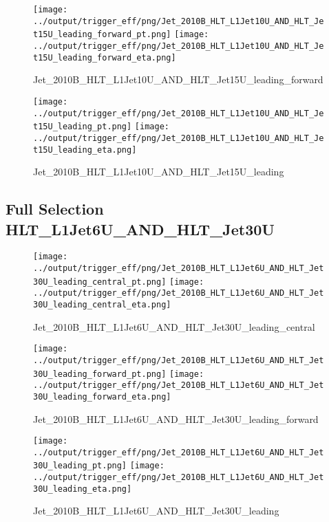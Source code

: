 \documentclass[11pt]{article}
\begin{document}
\begin{figure}[ht]
\centering
\texttt{[image: ../output/trigger\_eff/png/Jet\_2010B\_HLT\_L1Jet10U\_AND\_HLT\_Jet15U\_leading\_forward\_pt.png]}
\texttt{[image: ../output/trigger\_eff/png/Jet\_2010B\_HLT\_L1Jet10U\_AND\_HLT\_Jet15U\_leading\_forward\_eta.png]}
\caption{Jet\_2010B\_HLT\_L1Jet10U\_AND\_HLT\_Jet15U\_leading\_forward}
\label{fig:jet_L1Jet10U_AND_HLT_Jet15U_leading_forward}
\end{figure}

\begin{figure}[ht]
\centering
\texttt{[image: ../output/trigger\_eff/png/Jet\_2010B\_HLT\_L1Jet10U\_AND\_HLT\_Jet15U\_leading\_pt.png]}
\texttt{[image: ../output/trigger\_eff/png/Jet\_2010B\_HLT\_L1Jet10U\_AND\_HLT\_Jet15U\_leading\_eta.png]}
\caption{Jet\_2010B\_HLT\_L1Jet10U\_AND\_HLT\_Jet15U\_leading}
\label{fig:jet_L1Jet10U_AND_HLT_Jet15U_leading}
\end{figure}

\newpage
\subsection{Full Selection HLT\_L1Jet6U\_AND\_HLT\_Jet30U}
\begin{figure}[ht]
\centering
\texttt{[image: ../output/trigger\_eff/png/Jet\_2010B\_HLT\_L1Jet6U\_AND\_HLT\_Jet30U\_leading\_central\_pt.png]}
\texttt{[image: ../output/trigger\_eff/png/Jet\_2010B\_HLT\_L1Jet6U\_AND\_HLT\_Jet30U\_leading\_central\_eta.png]}
\caption{Jet\_2010B\_HLT\_L1Jet6U\_AND\_HLT\_Jet30U\_leading\_central}
\label{fig:jet_L1Jet6U_AND_HLT_Jet30U_leading_central}
\end{figure}

\begin{figure}[ht]
\centering
\texttt{[image: ../output/trigger\_eff/png/Jet\_2010B\_HLT\_L1Jet6U\_AND\_HLT\_Jet30U\_leading\_forward\_pt.png]}
\texttt{[image: ../output/trigger\_eff/png/Jet\_2010B\_HLT\_L1Jet6U\_AND\_HLT\_Jet30U\_leading\_forward\_eta.png]}
\caption{Jet\_2010B\_HLT\_L1Jet6U\_AND\_HLT\_Jet30U\_leading\_forward}
\label{fig:jet_L1Jet6U_AND_HLT_Jet30U_leading_forward}
\end{figure}

\begin{figure}[ht]
\centering
\texttt{[image: ../output/trigger\_eff/png/Jet\_2010B\_HLT\_L1Jet6U\_AND\_HLT\_Jet30U\_leading\_pt.png]}
\texttt{[image: ../output/trigger\_eff/png/Jet\_2010B\_HLT\_L1Jet6U\_AND\_HLT\_Jet30U\_leading\_eta.png]}
\caption{Jet\_2010B\_HLT\_L1Jet6U\_AND\_HLT\_Jet30U\_leading}
\label{fig:jet_L1Jet6U_AND_HLT_Jet30U_leading}
\end{figure}
\end{document}
